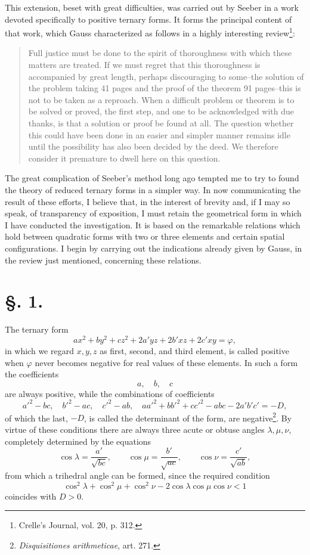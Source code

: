 \documentclass[11pt]{article}
\begin{document}
This extension, beset with great difficulties, was carried out by Seeber in a work devoted specifically to positive ternary forms. It forms the principal content of that work, which Gauss characterized as follows in a highly interesting review\footnote{Crelle's Journal, vol. 20, p. 312.}:

\begin{quote}
Full justice must be done to the spirit of thoroughness with which these matters are treated. If we must regret that this thoroughness is accompanied by great length, perhaps discouraging to some--the solution of the problem taking 41 pages and the proof of the theorem 91 pages--this is not to be taken as a reproach. When a difficult problem or theorem is to be solved or proved, the first step, and one to be acknowledged with due thanks, is that a solution or proof be found at all. The question whether this could have been done in an easier and simpler manner remains idle until the possibility has also been decided by the deed. We therefore consider it premature to dwell here on this question.
\end{quote}

The great complication of Seeber's method long ago tempted me to try to found the theory of reduced ternary forms in a simpler way. In now communicating the result of these efforts, I believe that, in the interest of brevity and, if I may so speak, of transparency of exposition, I must retain the geometrical form in which I have conducted the investigation. It is based on the remarkable relations which hold between quadratic forms with two or three elements and certain spatial configurations. I begin by carrying out the indications already given by Gauss, in the review just mentioned, concerning these relations.

\section*{§. 1.}

The ternary form
\begin{equation}
 ax^2+by^2+cz^2+2a'yz+2b'xz+2c'xy=\varphi,
\end{equation}
in which we regard $x,y,z$ as first, second, and third element, is called positive when $\varphi$ never becomes negative for real values of these elements. In such a form the coefficients
\[
 a,\quad b,\quad c
\]
are always positive, while the combinations of coefficients
\begin{equation}
 a'^2-bc,\quad b'^2-ac,\quad c'^2-ab,\quad aa'^2+bb'^2+cc'^2-abc-2a'b'c'=-D,
\end{equation}
of which the last, $-D$, is called the determinant of the form, are negative\footnote{\emph{Disquisitiones arithmeticae}, art. 271.}. By virtue of these conditions there are always three acute or obtuse angles $\lambda,\mu,\nu$, completely determined by the equations
\[
 \cos\lambda=\frac{a'}{\sqrt{bc}},\qquad
 \cos\mu=\frac{b'}{\sqrt{ac}},\qquad
 \cos\nu=\frac{c'}{\sqrt{ab}},
\]
from which a trihedral angle can be formed, since the required condition
\[
 \cos^2\lambda+\cos^2\mu+\cos^2\nu-2\cos\lambda\cos\mu\cos\nu<1
\]
coincides with $D>0$.
\end{document}
